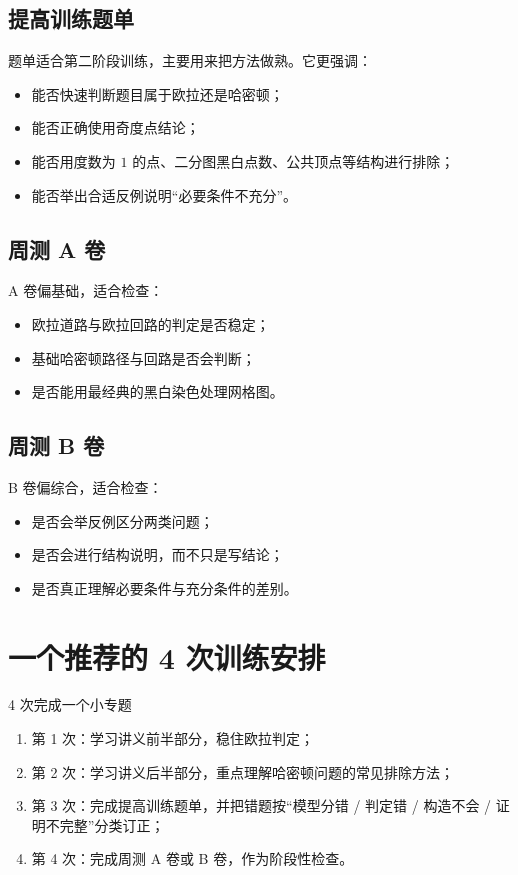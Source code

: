 \documentclass[11pt,a4paper,fontset=fandol]{ctexart}
\begin{document}
\subsection{提高训练题单}
题单适合第二阶段训练，主要用来把方法做熟。它更强调：
\begin{itemize}
  \item 能否快速判断题目属于欧拉还是哈密顿；
  \item 能否正确使用奇度点结论；
  \item 能否用度数为 $1$ 的点、二分图黑白点数、公共顶点等结构进行排除；
  \item 能否举出合适反例说明“必要条件不充分”。
\end{itemize}

\subsection{周测 A 卷}
A 卷偏基础，适合检查：
\begin{itemize}
  \item 欧拉道路与欧拉回路的判定是否稳定；
  \item 基础哈密顿路径与回路是否会判断；
  \item 是否能用最经典的黑白染色处理网格图。
\end{itemize}

\subsection{周测 B 卷}
B 卷偏综合，适合检查：
\begin{itemize}
  \item 是否会举反例区分两类问题；
  \item 是否会进行结构说明，而不只是写结论；
  \item 是否真正理解必要条件与充分条件的差别。
\end{itemize}

\section{一个推荐的 4 次训练安排}

\begin{goalbox}{4 次完成一个小专题}
\begin{enumerate}
  \item 第 1 次：学习讲义前半部分，稳住欧拉判定；
  \item 第 2 次：学习讲义后半部分，重点理解哈密顿问题的常见排除方法；
  \item 第 3 次：完成提高训练题单，并把错题按“模型分错 / 判定错 / 构造不会 / 证明不完整”分类订正；
  \item 第 4 次：完成周测 A 卷或 B 卷，作为阶段性检查。
\end{enumerate}
\end{goalbox}
\end{document}
